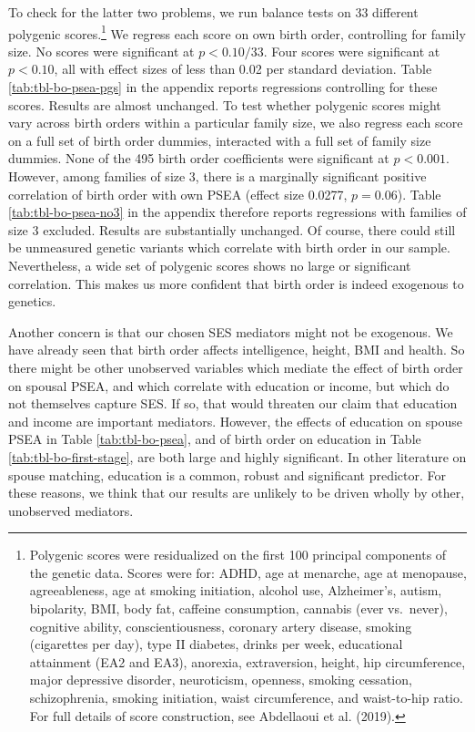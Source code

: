 \documentclass[
]{article}
\theoremstyle{definition}
\theoremstyle{definition}
\theoremstyle{definition}
\theoremstyle{definition}
\theoremstyle{remark}
\begin{document}
To check for the latter two problems, we run balance tests on 33 different
polygenic scores.\footnote{Polygenic scores were residualized on the first 100 principal
  components of the genetic data. Scores were for: ADHD, age at
  menarche, age at menopause, agreeableness, age at smoking
  initiation, alcohol use, Alzheimer's, autism, bipolarity, BMI, body
  fat, caffeine consumption, cannabis (ever vs.~never), cognitive
  ability, conscientiousness, coronary artery disease, smoking
  (cigarettes per day), type II diabetes, drinks per week, educational
  attainment (EA2 and EA3), anorexia, extraversion, height, hip
  circumference, major depressive disorder, neuroticism, openness,
  smoking cessation, schizophrenia, smoking initiation, waist
  circumference, and waist-to-hip ratio. For full details of score
  construction, see Abdellaoui et al. (2019).} We regress each score on own birth order, controlling for
family size. No scores were significant at \(p < 0.10/33\). Four scores were
significant at \(p < 0.10\), all with effect sizes of less than 0.02 per standard
deviation. Table \ref{tab:tbl-bo-psea-pgs} in the appendix reports
regressions controlling for these scores. Results are almost unchanged. To test
whether polygenic scores might vary across birth orders within a particular
family size, we also regress each score on a full set of birth order dummies,
interacted with a full set of family size dummies. None of the
495 birth order coefficients were significant at \(p < 0.001\).
However, among families of size 3, there is a marginally significant positive
correlation of birth order with own PSEA (effect size
0.0277, \(p = 0.06\)). Table
\ref{tab:tbl-bo-psea-no3} in the appendix therefore reports regressions with
families of size 3 excluded. Results are substantially unchanged. Of course,
there could still be unmeasured genetic variants which correlate with birth
order in our sample. Nevertheless, a wide set of polygenic scores shows no large
or significant correlation. This makes us more confident that birth order is
indeed exogenous to genetics.

Another concern is that our chosen SES mediators might not be exogenous. We have
already seen that birth order affects intelligence, height, BMI
and health. So there might be other unobserved variables which mediate the effect
of birth order on spousal PSEA, and which correlate with education or income,
but which do not themselves capture SES. If so, that would threaten our claim
that education and income are important mediators. However, the effects of
education on spouse PSEA in Table \ref{tab:tbl-bo-psea}, and of birth order on
education in Table \ref{tab:tbl-bo-first-stage}, are both large and highly
significant. In other literature on spouse matching, education is a common,
robust and significant predictor. For these reasons, we think that our results
are unlikely to be driven wholly by other, unobserved mediators.
\end{document}

